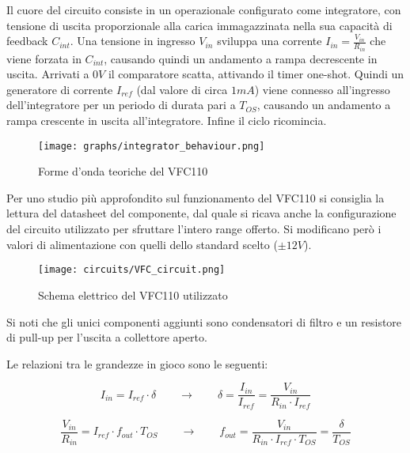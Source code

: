 Il cuore del circuito consiste in un operazionale configurato come integratore, con tensione
di uscita proporzionale alla carica immagazzinata nella sua capacità di feedback $C_{int}$.
Una tensione in ingresso $V_{in}$ sviluppa una corrente $I_{in}=\frac{V_{in}}{R_{in}}$
che viene forzata in $C_{int}$, causando quindi un andamento a rampa decrescente in uscita.
Arrivati a $0V$ il comparatore scatta, attivando il timer one-shot. Quindi un generatore
di corrente $I_{ref}$ (dal valore di circa $1mA$) viene connesso all'ingresso dell'integratore
per un periodo di durata pari a $T_{OS}$, causando un andamento a rampa crescente in uscita
all'integratore. Infine il ciclo ricomincia.

\begin{figure}[ht]
    \centering
    \texttt{[image: graphs/integrator\_behaviour.png]}
    \caption{Forme d'onda teoriche del VFC110}
    \label{integrator behaviour}
\end{figure}

Per uno studio più approfondito sul funzionamento del VFC110 si consiglia la lettura del
datasheet del componente, dal quale si ricava anche la configurazione del circuito utilizzato
per sfruttare l'intero range offerto. Si modificano però i valori di alimentazione con
quelli dello standard scelto ($\pm 12V$).
\medskip

\begin{figure}[ht]
    \centering
    \texttt{[image: circuits/VFC\_circuit.png]}
    \caption{Schema elettrico del VFC110 utilizzato}
    \label{VFC_circuit}
\end{figure}

Si noti che gli unici componenti aggiunti sono condensatori di filtro e un resistore di
pull-up per l'uscita a collettore aperto.

Le relazioni tra le grandezze in gioco sono le seguenti:

\begin{displaymath}
    I_{in}=I_{ref}\cdot\delta
    \qquad
    \rightarrow
    \qquad
    \delta=\frac{I_{in}}{I_{ref}}=\frac{V_{in}}{R_{in}\cdot I_{ref}}
\end{displaymath}

\begin{displaymath}
    \frac{V_{in}}{R_{in}}=I_{ref}\cdot f_{out}\cdot T_{OS}
    \qquad
    \rightarrow
    \qquad
    f_{out}=\frac{V_{in}}{R_{in}\cdot I_{ref}\cdot T_{OS}}=\frac{\delta}{T_{OS}}
\end{displaymath}


